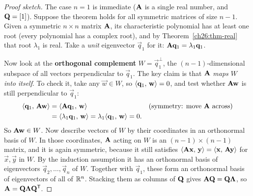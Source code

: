 \begin{proof}[Proof sketch]
The case $n=1$ is immediate ($\mathbf{A}$ is a single real number, and
$\mathbf{Q}=[1]$). Suppose the theorem
holds for all symmetric matrices of size $n-1$. Given a symmetric $n\times n$
matrix $\mathbf{A}$, its characteristic polynomial has at least one root
(every polynomial has a complex root), and by Theorem~\ref{ch26:thm-real} that
root $\lambda_1$ is real. Take a \emph{unit}
eigenvector $\vec{q}_1$ for it: $\mathbf{A}\mathbf{q}_1=\lambda_1\mathbf{q}_1$.

Now look at the \textbf{orthogonal complement} $W = \vec{q}_1^{\perp}$, the
$(n-1)$-dimensional subspace of all vectors perpendicular to $\vec{q}_1$. The key
claim is that $\mathbf{A}$ \emph{maps $W$ into itself}. To check it, take any
$\vec{w}\in W$, so $\langle \mathbf{q}_1,\, \mathbf{w} \rangle=0$, and test whether $\mathbf{A}\mathbf{w}$
is still perpendicular to $\vec{q}_1$:
\begin{align*}
  \langle \mathbf{q}_1,\, \mathbf{A}\mathbf{w} \rangle
  &= \langle \mathbf{A}\mathbf{q}_1,\, \mathbf{w} \rangle && \text{(symmetry: move } \mathbf{A} \text{ across)}\\
  &= \langle \lambda_1\mathbf{q}_1,\, \mathbf{w} \rangle
  = \lambda_1\langle \mathbf{q}_1,\, \mathbf{w} \rangle = 0.
\end{align*}
So $\mathbf{A}\mathbf{w}\in W$. Now describe vectors of $W$ by their coordinates in an
orthonormal basis of $W$. In those coordinates, $\mathbf{A}$ acting on $W$ is an
$(n-1)\times(n-1)$ matrix, and it is again symmetric, because it still satisfies
$\langle \mathbf{A}\mathbf{x},\, \mathbf{y} \rangle = \langle \mathbf{x},\, \mathbf{A}\mathbf{y} \rangle$ for
$\vec{x},\vec{y}$ in $W$. By the induction assumption it has an
orthonormal basis of eigenvectors $\vec{q}_2,\dots,\vec{q}_n$ of $W$. Together with
$\vec{q}_1$, these form an orthonormal basis of eigenvectors of all of $\mathbb{R}^n$.
Stacking them as columns of $\mathbf{Q}$ gives $\mathbf{A}\mathbf{Q}=\mathbf{Q}\mathbf{\Lambda}$,
so $\mathbf{A}=\mathbf{Q}\mathbf{\Lambda}\mathbf{Q}^{\mathsf{T}}$.
\end{proof}

